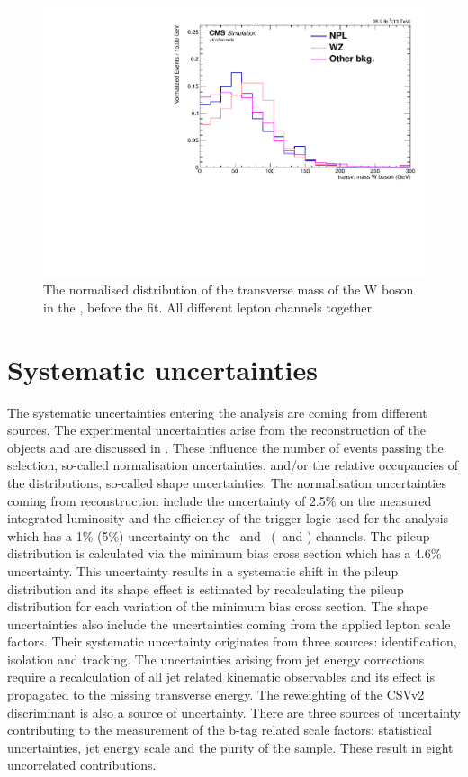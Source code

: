\begin{figure}[htbp]
	\centering
	\includegraphics[width=0.49\linewidth]{6_Search/Figures/MTWnormalised/MTW_all_Normalized}
	\caption{The normalised distribution of the transverse mass of the W boson in the \WZCR, before the fit. All different lepton channels together. }
	\label{fig:mtwallnorm}
\end{figure}


\section{Systematic uncertainties}
\label{sec:sys}
The systematic uncertainties entering the analysis are coming from different sources. The experimental uncertainties arise from the reconstruction of the objects and are discussed in . These influence the number of events passing the selection, so-called normalisation uncertainties, and/or the relative occupancies of the distributions, so-called shape
 uncertainties. The normalisation uncertainties coming from reconstruction include the uncertainty of 2.5\% on the measured integrated luminosity and the efficiency of the trigger logic used for the analysis which has a 1\% (5\%) uncertainty on the 
 \mumumu\ and \emumu\ (\eemu\ and \eee) channels. The  pileup distribution is calculated via the minimum bias cross section which has a 4.6\% uncertainty. This uncertainty results in a systematic shift in the pileup distribution and its shape effect is estimated by recalculating the pileup distribution for each variation of the minimum bias cross section. The shape uncertainties also include the uncertainties coming from the applied lepton scale factors. Their systematic uncertainty originates from three sources: identification, isolation and tracking.  The uncertainties arising from jet energy corrections require a recalculation of all jet related kinematic observables and its effect is propagated to the missing transverse energy.  The reweighting of the CSVv2 discriminant is also a source of uncertainty. There are three sources of uncertainty contributing to the measurement of the b-tag related scale factors: statistical uncertainties, jet energy scale and the purity of the sample. These result in eight uncorrelated contributions. 
 
